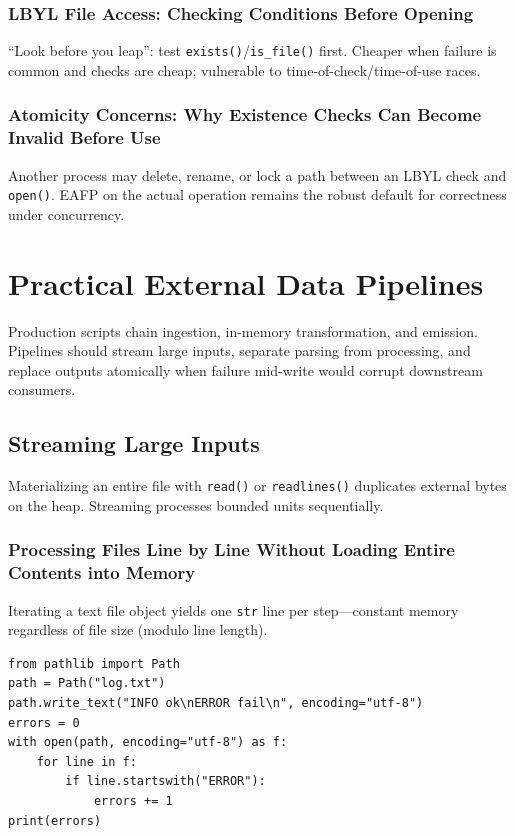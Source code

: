 \documentclass[a4paper,twoside]{report}
\begin{document}
\subsubsection{LBYL File Access: Checking Conditions Before Opening}

``Look before you leap'': test \texttt{exists()}/\texttt{is\_file()} first. Cheaper when failure is common and checks are cheap; vulnerable to time-of-check/time-of-use races.

\subsubsection{Atomicity Concerns: Why Existence Checks Can Become Invalid Before Use}

Another process may delete, rename, or lock a path between an LBYL check and \texttt{open()}. EAFP on the actual operation remains the robust default for correctness under concurrency.


\section{Practical External Data Pipelines}

Production scripts chain ingestion, in-memory transformation, and emission. Pipelines should stream large inputs, separate parsing from processing, and replace outputs atomically when failure mid-write would corrupt downstream consumers.


\subsection{Streaming Large Inputs}

Materializing an entire file with \texttt{read()} or \texttt{readlines()} duplicates external bytes on the heap. Streaming processes bounded units sequentially.

\subsubsection{Processing Files Line by Line Without Loading Entire Contents into Memory}

Iterating a text file object yields one \texttt{str} line per step---constant memory regardless of file size (modulo line length).

\begin{verbatim}
from pathlib import Path
path = Path("log.txt")
path.write_text("INFO ok\nERROR fail\n", encoding="utf-8")
errors = 0
with open(path, encoding="utf-8") as f:
    for line in f:
        if line.startswith("ERROR"):
            errors += 1
print(errors)
\end{verbatim}
\end{document}
